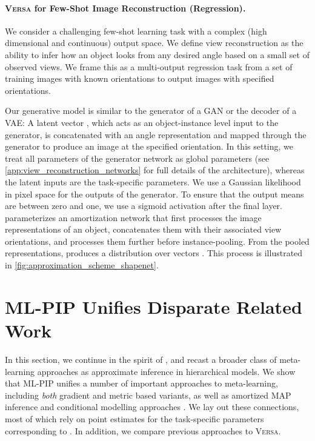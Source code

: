 \documentclass{article}
\newcommand{\Versa}{\textsc{Versa}}
\begin{document}
\paragraph{\Versa{} for Few-Shot Image Reconstruction (Regression).} We consider a challenging few-shot learning task with a complex (high dimensional and continuous) output space. We define view reconstruction as the ability to infer how an object looks from any desired angle based on a small set of observed views. We frame this as a multi-output regression task from a set of training images with known orientations to output images with specified orientations. 

Our generative model is similar to the generator of a GAN or the decoder of a VAE: A latent vector , which acts as an object-instance level input to the generator, is concatenated with an angle representation and mapped through the generator to produce an image at the specified orientation. In this setting, we treat all parameters  of the generator network as global parameters (see \cref{app:view_reconstruction_networks} for full details of the architecture), whereas the latent inputs  are the task-specific parameters. We use a Gaussian likelihood in pixel space for the outputs of the generator. To ensure that the output means are between zero and one, we use a sigmoid activation after the final layer.  parameterizes an amortization network that first processes the image representations of an object, concatenates them with their associated view orientations, and processes them further before instance-pooling. From the pooled representations,  produces a distribution over vectors . This process is illustrated in \cref{fig:approximation_scheme_shapenet}. 



\section{ML-PIP Unifies Disparate Related Work}
\label{sec:related_work}

In this section, we continue in the spirit of \citet{grant2018recasting}, and recast a broader class of meta-learning approaches as approximate inference in hierarchical models. We show that ML-PIP unifies a number of important approaches to meta-learning, including \textit{both} gradient and metric based variants, as well as amortized MAP inference and conditional modelling approaches \citep{garnelo2018conditional}. We lay out these connections, most of which rely on point estimates for the task-specific parameters  corresponding to . In addition, we compare previous approaches to \Versa{}.
\end{document}
